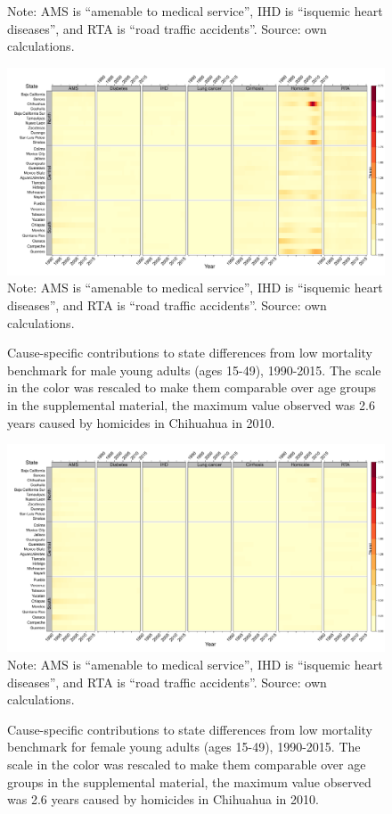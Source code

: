 \documentclass[11.5pt]{article}
\begin{document}
{\begin{figure}
Note: AMS is ``amenable to medical service'', IHD is ``isquemic heart diseases'', and RTA is ``road traffic accidents''. Source: own calculations.\end{figure}


\begin{figure}
\centering
\caption{Cause-specific contributions to state differences from low mortality benchmark for male young adults (ages 15-49), 1990-2015. The scale in the color was rescaled to make them comparable over age groups in the supplemental material, the maximum value observed was 2.6 years caused by homicides in Chihuahua in 2010.}
\label{fig:e15_39_males}
\includegraphics[scale=.3]{YoungAdult_Male_heatmap.pdf}
Note: AMS is ``amenable to medical service'', IHD is ``isquemic heart diseases'', and RTA is ``road traffic accidents''. Source: own calculations.
\end{figure}

\begin{figure}
\centering
\caption{Cause-specific contributions to state differences from low mortality benchmark for female young adults (ages 15-49), 1990-2015. The scale in the color was rescaled to make them comparable over age groups in the supplemental material, the maximum value observed was 2.6 years caused by homicides in Chihuahua in 2010.}
\label{fig:e15_39_females}
\includegraphics[scale=.3]{YoungAdult_Female_heatmap.pdf}
Note: AMS is ``amenable to medical service'', IHD is ``isquemic heart diseases'', and RTA is ``road traffic accidents''. Source: own calculations.
\end{figure}



}
\end{document}
